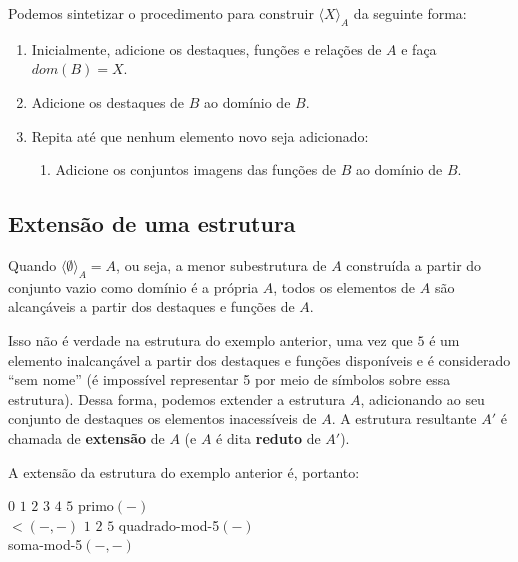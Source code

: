 Podemos sintetizar o procedimento para construir $\langle X \rangle_A$ da seguinte forma:
\begin{enumerate}
    \item Inicialmente, adicione os destaques, funções e relações de $A$ e faça $dom(B) = X$.
    \item Adicione os destaques de $B$ ao domínio de $B$.
    \item Repita até que nenhum elemento novo seja adicionado:
    \begin{enumerate}
        \item Adicione os conjuntos imagens das funções de $B$ ao domínio de $B$.
    \end{enumerate}  
\end{enumerate}

\subsection{Extensão de uma estrutura}

Quando $\langle \emptyset \rangle_A = A$, ou seja, a menor subestrutura de $A$ construída a partir do conjunto vazio como domínio é a própria $A$, todos os elementos de $A$ são alcançáveis a partir dos destaques e funções de $A$.

Isso não é verdade na estrutura do exemplo anterior, uma vez que $5$ é um elemento inalcançável a partir dos destaques e funções disponíveis e é considerado ``sem nome'' (é impossível representar 5 por meio de símbolos sobre essa estrutura). Dessa forma, podemos extender a estrutura $A$, adicionando ao seu conjunto de destaques os elementos inacessíveis de $A$. A estrutura resultante $A'$ é chamada de \textbf{extensão} de $A$ (e $A$ é dita \textbf{reduto} de $A'$).
    
A extensão da estrutura do exemplo anterior é, portanto:
\begin{center}
    \begin{structure}
        {}
        {$0$ $1$ $2$ $3$ $4$ $5$}
        {primo$(-)$\\$<$$(-,-)$}
        {$1$ $2$ $5$}
        {quadrado-mod-5$(-)$\\soma-mod-5$(-,-)$}
    \end{structure} 
\end{center}